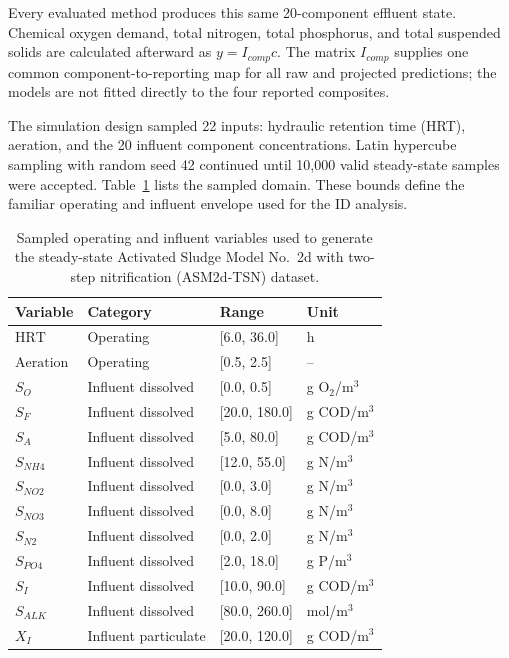 \documentclass[a4paper,fleqn]{cas-sc}
\begin{document}
Every evaluated method produces this same 20-component effluent state. Chemical oxygen demand, total nitrogen, total phosphorus, and total suspended solids are calculated afterward as $y=I_{comp}c$. The matrix $I_{comp}$ supplies one common component-to-reporting map for all raw and projected predictions; the models are not fitted directly to the four reported composites.

The simulation design sampled 22 inputs: hydraulic retention time (HRT), aeration, and the 20 influent component concentrations. Latin hypercube sampling with random seed 42 continued until 10,000 valid steady-state samples were accepted. Table~\ref{tab:simulation_domain} lists the sampled domain. These bounds define the familiar operating and influent envelope used for the ID analysis.

\begin{table}[htbp]
\centering
\caption{Sampled operating and influent variables used to generate the steady-state Activated Sludge Model No.\ 2d with two-step nitrification (ASM2d-TSN) dataset.}
\label{tab:simulation_domain}
\scriptsize
\setlength{\tabcolsep}{3pt}
\begin{tabular}{p{2.1cm}p{2.7cm}p{2.8cm}p{3.0cm}}
\hline
Variable & Category & Range & Unit \\
\hline
$\mathrm{HRT}$ & Operating & [6.0, 36.0] & h \\
$\mathrm{Aeration}$ & Operating & [0.5, 2.5] & -- \\
$S_O$ & Influent dissolved & [0.0, 0.5] & g O$_2$/m$^3$ \\
$S_F$ & Influent dissolved & [20.0, 180.0] & g COD/m$^3$ \\
$S_A$ & Influent dissolved & [5.0, 80.0] & g COD/m$^3$ \\
$S_{NH4}$ & Influent dissolved & [12.0, 55.0] & g N/m$^3$ \\
$S_{NO2}$ & Influent dissolved & [0.0, 3.0] & g N/m$^3$ \\
$S_{NO3}$ & Influent dissolved & [0.0, 8.0] & g N/m$^3$ \\
$S_{N2}$ & Influent dissolved & [0.0, 2.0] & g N/m$^3$ \\
$S_{PO4}$ & Influent dissolved & [2.0, 18.0] & g P/m$^3$ \\
$S_I$ & Influent dissolved & [10.0, 90.0] & g COD/m$^3$ \\
$S_{ALK}$ & Influent dissolved & [80.0, 260.0] & mol/m$^3$ \\
$X_I$ & Influent particulate & [20.0, 120.0] & g COD/m$^3$ \\

\end{tabular}
\end{table}
\end{document}
